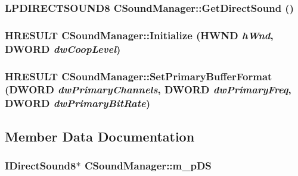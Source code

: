 \label{class_c_sound_manager_aac5c452d3d4314c8d3aeb16f9c143652}
\hypertarget{class_c_sound_manager_a4cf5b72143f7bb5f268b4152008de1dd}{
\subsubsection[{GetDirectSound}]{\setlength{\rightskip}{0pt plus 5cm}LPDIRECTSOUND8 CSoundManager::GetDirectSound ()}}
\label{class_c_sound_manager_a4cf5b72143f7bb5f268b4152008de1dd}
\hypertarget{class_c_sound_manager_a5360f8c247b45d00f141b528892ac4dc}{
\subsubsection[{Initialize}]{\setlength{\rightskip}{0pt plus 5cm}HRESULT CSoundManager::Initialize (HWND {\em hWnd}, \/  DWORD {\em dwCoopLevel})}}
\label{class_c_sound_manager_a5360f8c247b45d00f141b528892ac4dc}
\hypertarget{class_c_sound_manager_a2e20be973d38797e82362577b9156927}{
\subsubsection[{SetPrimaryBufferFormat}]{\setlength{\rightskip}{0pt plus 5cm}HRESULT CSoundManager::SetPrimaryBufferFormat (DWORD {\em dwPrimaryChannels}, \/  DWORD {\em dwPrimaryFreq}, \/  DWORD {\em dwPrimaryBitRate})}}
\label{class_c_sound_manager_a2e20be973d38797e82362577b9156927}


\subsection{Member Data Documentation}
\hypertarget{class_c_sound_manager_a453dcab3ba8fc5f622da84e609cb3363}{
\subsubsection[{m\_\-pDS}]{\setlength{\rightskip}{0pt plus 5cm}IDirectSound8$\ast$ {\bf CSoundManager::m\_\-pDS}}}
\label{class_c_sound_manager_a453dcab3ba8fc5f622da84e609cb3363}


